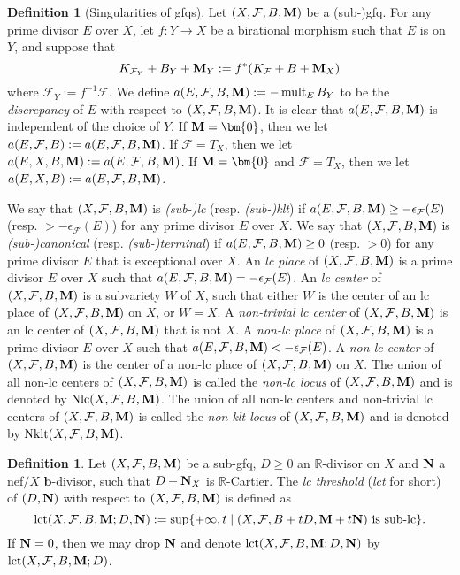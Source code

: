 \documentclass[11pt]{amsart}
\numberwithin{equation}{section}
\newcommand{\bb}{\bm{b}}
\newcommand{\Mm}{{\bf{M}}}
\newcommand{\Nn}{{\bf{N}}}
\newcommand{\Rr}{\mathbb{R}}
\newcommand{\Nklt}{\operatorname{Nklt}}
\newcommand{\lct}{\operatorname{lct}}
\newcommand{\Nlc}{\operatorname{Nlc}}
\newcommand{\mult}{\operatorname{mult}}
\newcommand{\Ff}{\mathcal{F}}
\theoremstyle{definition}
\newtheorem{defn}[thm]{Definition}
\theoremstyle{definition}
\theoremstyle{definition}
\begin{document}
\begin{defn}[Singularities of gfqs]\label{defn: gfq singularity}
Let $(X,\Ff,B,\Mm)$ be a (sub-)gfq. For any prime divisor $E$ over $X$, let $f: Y\rightarrow X$ be a birational morphism such that $E$ is on $Y$, and suppose that
$$K_{\Ff_Y}+B_Y+\Mm_Y:=f^*(K_\Ff+B+\Mm_X)$$
where $\Ff_Y:=f^{-1}\Ff$. We define $a(E,\Ff,B,\Mm):=-\mult_EB_Y$ to be the \emph{discrepancy} of $E$ with respect to $(X,\Ff,B,\Mm)$. It is clear that $a(E,\Ff,B,\Mm)$ is independent of the choice of $Y$. If $\Mm=\bm{0}$, then we let $a(E,\Ff,B):=a(E,\Ff,B,\Mm)$. If $\Ff=T_X$, then we let $a(E,X,B,\Mm):=a(E,\Ff,B,\Mm)$. If $\Mm=\bm{0}$ and $\Ff=T_X$, then we let $a(E,X,B):=a(E,\Ff,B,\Mm)$.

We say that $(X,\Ff,B,\Mm)$ is \emph{(sub-)lc} (resp. \emph{(sub-)klt}) if $a(E,\Ff,B,\Mm)\geq -\epsilon_{\Ff}(E)$ (resp. $>-\epsilon_{\Ff}(E)$) for any prime divisor $E$ over $X$. We say that $(X,\Ff,B,\Mm)$ is \emph{(sub-)canonical} (resp. \emph{(sub-)terminal}) if $a(E,\Ff,B,\Mm)\geq 0$ (resp. $>0$) for any prime divisor $E$ that is exceptional over $X$. An \emph{lc place} of $(X,\Ff,B,\Mm)$ is a prime divisor $E$ over $X$ such that $a(E,\Ff,B,\Mm)=-\epsilon_{\Ff}(E)$. An \emph{lc center} of $(X,\Ff,B,\Mm)$ is a subvariety $W$ of $X$, such that either $W$ is the center of an lc place of $(X,\Ff,B,\Mm)$ on $X$, or $W=X$. A \emph{non-trivial lc center} of $(X,\Ff,B,\Mm)$ is an lc center of $(X,\Ff,B,\Mm)$ that is not $X$. A \emph{non-lc place} of $(X,\Ff,B,\Mm)$ is a prime divisor $E$ over $X$ such that $a(E,\Ff,B,\Mm)<-\epsilon_{\Ff}(E)$. A \emph{non-lc center} of $(X,\Ff,B,\Mm)$ is the center of a non-lc place of $(X,\Ff,B,\Mm)$ on $X$. The union of all non-lc centers of $(X,\Ff,B,\Mm)$ is called the \emph{non-lc locus} of $(X,\Ff,B,\Mm)$ and is denoted by $\Nlc(X,\Ff,B,\Mm)$. The union of all non-lc centers and non-trivial lc centers of $(X,\Ff,B,\Mm)$ is called the \emph{non-klt locus} of $(X,\Ff,B,\Mm)$ and is denoted by $\Nklt(X,\Ff,B,\Mm)$.
\end{defn}

\begin{defn}\label{defn: lct}
  Let $(X,\Ff,B,\Mm)$ be a sub-gfq, $D\geq 0$ an $\Rr$-divisor on $X$ and $\Nn$ a nef$/X$ $\bb$-divisor, such that $D+\Nn_X$ is $\Rr$-Cartier. The \emph{lc threshold} (\emph{lct} for short) of $(D,\Nn)$ with respect to $(X,\Ff,B,\Mm)$ is defined as
  $$\lct(X,\Ff,B,\Mm;D,\Nn):=\sup\{+\infty,t\mid (X,\Ff,B+tD,\Mm+t\Nn)\text{ is sub-lc}\}.$$
  If $\Nn=0$, then we may drop $\Nn$ and denote $\lct(X,\Ff,B,\Mm;D,\Nn)$ by $\lct(X,\Ff,B,\Mm;D)$.
\end{defn}
\end{document}
